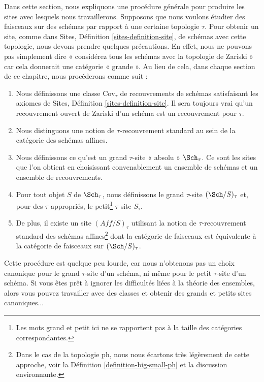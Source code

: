 \noindent
Dans cette section, nous expliquons une procédure générale pour produire les sites avec lesquels nous travaillerons. Supposons que nous voulons étudier des faisceaux sur des schémas par rapport à une certaine topologie $\tau$. Pour obtenir un site, comme dans Sites, Définition \ref{sites-definition-site}, de schémas avec cette topologie, nous devons prendre quelques précautions. En effet, nous ne pouvons pas simplement dire « considérez tous les schémas avec la topologie de Zariski » car cela donnerait une catégorie « grande ». Au lieu de cela, dans chaque section de ce chapitre, nous procéderons comme suit :
\begin{enumerate}
\item Nous définissons une classe $\text{Cov}_\tau$ de recouvrements de schémas satisfaisant les axiomes de Sites, Définition \ref{sites-definition-site}. Il sera toujours vrai qu'un recouvrement ouvert de Zariski d'un schéma est un recouvrement pour $\tau$.
\item Nous distinguons une notion de $\tau$-recouvrement standard au sein de la catégorie des schémas affines.
\item Nous définissons ce qu'est un grand $\tau$-site « absolu » $\Sch_\tau$. Ce sont les sites que l'on obtient en choisissant convenablement un ensemble de schémas et un ensemble de recouvrements.
\item Pour tout objet $S$ de $\Sch_\tau$, nous définissons le grand $\tau$-site $(\Sch/S)_\tau$ et, pour des $\tau$ appropriés, le petit\footnote{Les mots grand et petit ici ne se rapportent pas à la taille des catégories correspondantes.} $\tau$-site $S_\tau$.
\item De plus, il existe un site $(\textit{Aff}/S)_\tau$ utilisant la notion de $\tau$-recouvrement standard des schémas affines\footnote{Dans le cas de la topologie ph, nous nous écartons très légèrement de cette approche, voir la Définition \ref{definition-big-small-ph} et la discussion environnante.} dont la catégorie de faisceaux est équivalente à la catégorie de faisceaux sur $(\Sch/S)_\tau$.
\end{enumerate}
Cette procédure est quelque peu lourde, car nous n'obtenons pas un choix canonique pour le grand $\tau$-site d'un schéma, ni même pour le petit $\tau$-site d'un schéma. Si vous êtes prêt à ignorer les difficultés liées à la théorie des ensembles, alors vous pouvez travailler avec des classes et obtenir des grands et petits sites canoniques...







